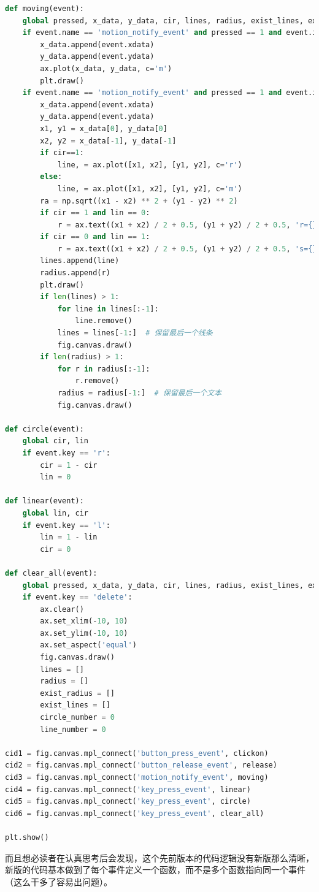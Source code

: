 \documentclass[12pt]{article}
\begin{document}
\begin{lstlisting}[language=Python]
def moving(event):
    global pressed, x_data, y_data, cir, lines, radius, exist_lines, exist_radius
    if event.name == 'motion_notify_event' and pressed == 1 and event.inaxes is not None and cir + lin == 0:
        x_data.append(event.xdata)
        y_data.append(event.ydata)
        ax.plot(x_data, y_data, c='m')
        plt.draw()
    if event.name == 'motion_notify_event' and pressed == 1 and event.inaxes is not None and cir + lin != 0:
        x_data.append(event.xdata)
        y_data.append(event.ydata)
        x1, y1 = x_data[0], y_data[0]
        x2, y2 = x_data[-1], y_data[-1]
        if cir==1:
            line, = ax.plot([x1, x2], [y1, y2], c='r')
        else:
            line, = ax.plot([x1, x2], [y1, y2], c='m')
        ra = np.sqrt((x1 - x2) ** 2 + (y1 - y2) ** 2)
        if cir == 1 and lin == 0:
            r = ax.text((x1 + x2) / 2 + 0.5, (y1 + y2) / 2 + 0.5, 'r={}'.format(round(ra, 2)), fontdict={'fontsize': 10, 'fontweight': 'light', 'color': 'blue'})
        if cir == 0 and lin == 1:
            r = ax.text((x1 + x2) / 2 + 0.5, (y1 + y2) / 2 + 0.5, 's={}'.format(round(ra, 2)), fontdict={'fontsize': 10, 'fontweight': 'light', 'color': 'blue'})
        lines.append(line)
        radius.append(r)
        plt.draw()
        if len(lines) > 1:
            for line in lines[:-1]:
                line.remove()
            lines = lines[-1:]  # 保留最后一个线条
            fig.canvas.draw()
        if len(radius) > 1:
            for r in radius[:-1]:
                r.remove()
            radius = radius[-1:]  # 保留最后一个文本
            fig.canvas.draw()

def circle(event):
    global cir, lin
    if event.key == 'r':
        cir = 1 - cir
        lin = 0

def linear(event):
    global lin, cir
    if event.key == 'l':
        lin = 1 - lin
        cir = 0

def clear_all(event):
    global pressed, x_data, y_data, cir, lines, radius, exist_lines, exist_radius, circle_number, line_number
    if event.key == 'delete':
        ax.clear()
        ax.set_xlim(-10, 10)
        ax.set_ylim(-10, 10)
        ax.set_aspect('equal')
        fig.canvas.draw()
        lines = []
        radius = []
        exist_radius = []
        exist_lines = []
        circle_number = 0
        line_number = 0

cid1 = fig.canvas.mpl_connect('button_press_event', clickon)
cid2 = fig.canvas.mpl_connect('button_release_event', release)
cid3 = fig.canvas.mpl_connect('motion_notify_event', moving)
cid4 = fig.canvas.mpl_connect('key_press_event', linear)
cid5 = fig.canvas.mpl_connect('key_press_event', circle)
cid6 = fig.canvas.mpl_connect('key_press_event', clear_all)

plt.show()

\end{lstlisting}
而且想必读者在认真思考后会发现，这个先前版本的代码逻辑没有新版那么清晰，新版的代码基本做到了每个事件定义一个函数，而不是多个函数指向同一个事件（这么干多了容易出问题）。
\end{document}
